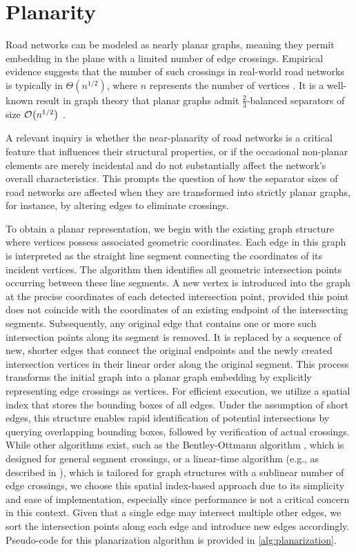 \section{Planarity} \label{sec:approach:planarity}

Road networks can be modeled as nearly planar graphs, meaning they permit embedding in the plane with a limited number of edge crossings.
Empirical evidence suggests that the number of such crossings in real-world road networks is typically in \(\Theta\!\left(n^{1/2}\right)\), where \(n\) represents the number of vertices \cite{eppstein_studying_2008}.
It is a well-known result in graph theory that planar graphs admit \(\frac23\)-balanced
separators of size \(\mathcal{O}\!\left({n}^{1/2}\right)\) \cite{lipton_separator_1979}.

A relevant inquiry is whether the near-planarity of road networks is a critical
feature that influences their structural properties, or if the occasional
non-planar elements are merely incidental and do not substantially affect the
network’s overall characteristics. This prompts the question of how the
separator sizes of road networks are affected when they are transformed into
strictly planar graphs, for instance, by altering edges to eliminate crossings.

To obtain a planar representation, we begin with the existing graph structure where vertices possess associated geometric coordinates.
Each edge in this graph is interpreted as the straight line segment connecting the coordinates of its incident vertices.
The algorithm then identifies all geometric intersection points occurring between these line segments.
A new vertex is introduced into the graph at the precise coordinates of each detected intersection point, provided this point does not coincide with the coordinates of an existing endpoint of the intersecting segments.
Subsequently, any original edge that contains one or more such intersection points along its segment is removed.
It is replaced by a sequence of new, shorter edges that connect the original endpoints and the newly created intersection vertices in their linear order along the original segment.
This process transforms the initial graph into a planar graph embedding by explicitly representing edge crossings as vertices.
For efficient execution, we utilize a spatial index that stores the bounding boxes of all
edges. Under the assumption of short edges, this structure enables rapid
identification of potential intersections by querying overlapping bounding
boxes, followed by verification of actual crossings. While other algorithms
exist, such as the Bentley-Ottmann algorithm \cite{bentley_algorithms_1979},
which is designed for general segment crossings, or a linear-time algorithm
(e.g., as described in \cite{eppstein_linear-time_2010}), which is tailored for
graph structures with a sublinear number of edge crossings, we choose this
spatial index-based approach due to its simplicity and ease of implementation,
especially since performance is not a critical concern in this context. Given
that a single edge may intersect multiple other edges, we sort the intersection
points along each edge and introduce new edges accordingly. Pseudo-code for
this planarization algorithm is provided in \cref{alg:planarization}.

